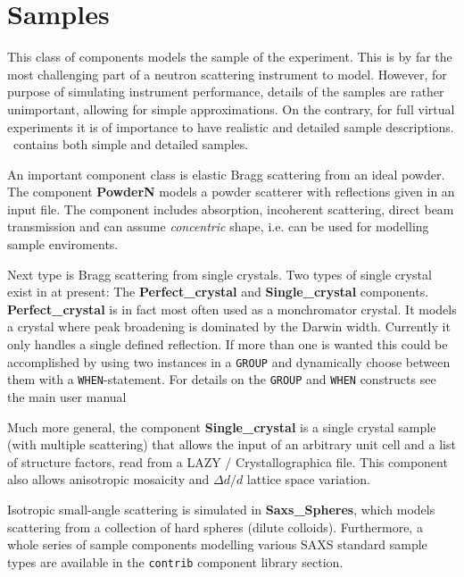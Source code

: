 \chapter{Samples}
\label{c:samples}

This class of components models the sample of the experiment.
This is by far the most challenging part of a neutron scattering
instrument to model. However, for purpose of simulating
instrument performance, details of the samples are rather unimportant,
allowing for simple approximations. On the contrary, for full
virtual experiments it is of importance to have realistic and
detailed sample descriptions. \MCX\ contains both simple and detailed
samples.

An important component class is elastic Bragg scattering from an ideal powder.
The component \textbf{PowderN} models a powder scatterer with reflections
given in an input file. 
The component includes absorption, incoherent scattering, direct beam
transmission and can assume \emph{concentric} shape, i.e. can be used
for modelling sample enviroments.

Next type is Bragg scattering from single crystals. Two types of single crystal exist in \MCX
at present: The \textbf{Perfect\_crystal} and \textbf{Single\_crystal} components.
\textbf{Perfect\_crystal} is in fact most often used as a monchromator crystal. It models a 
crystal where peak broadening is dominated by the Darwin width. Currently it only handles a
single defined reflection. If more than one is wanted this could be
accomplished by using two instances in a \texttt{GROUP} and dynamically choose between
them with a \texttt{WHEN}-statement. For details on the \texttt{GROUP} and \texttt{WHEN} constructs see the
main \MCX user manual~\cite{mcxtracemanual}

Much more general, the component \textbf{Single\_crystal}
is a single crystal sample (with multiple scattering) that allows
the input of an arbitrary unit cell and a list of structure factors, read
from a LAZY / Crystallographica file.
This component also allows anisotropic mosaicity
and $\Delta d/d$ lattice space variation.

Isotropic small-angle scattering is simulated in \textbf{Saxs\_Spheres},
which models scattering from a collection of hard spheres (dilute colloids).
Furthermore, a whole series of sample components modelling various SAXS standard 
sample types are available in the  \texttt{contrib} component library section.

